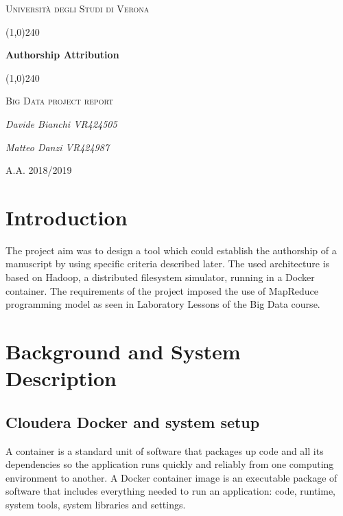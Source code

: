 \documentclass[a4paper,11pt, twoside]{article}
\begin{document}
	\clearpage
	\begin{titlepage}
		\centering
		\vspace*{\fill}
		{\scshape\LARGE Università degli Studi di Verona \par}
		\vspace{1.5cm}
		\line(1,0){240} \\
		{\huge\bfseries Authorship Attribution\par}
		\line(1,0){240} \\
		\vspace{0.5cm}
		{\scshape\Large Big Data project report\par}
		\vspace{2cm}
		{\Large\itshape Davide Bianchi VR424505\par
		\Large\itshape Matteo Danzi VR424987\par}
		\vspace{1cm}
		\vspace{5cm}
		\vspace*{\fill}
		{\large A.A. 2018/2019\par}
	\end{titlepage}
	\thispagestyle{empty}
	\newpage
	\tableofcontents
	\newpage
	
	\section{Introduction}
	The project aim was to design a tool which could establish the authorship of a manuscript by using specific criteria described later. 
	The used architecture is based on Hadoop, a distributed filesystem simulator, running in a Docker container. The requirements of the project imposed the use of MapReduce programming model as seen in Laboratory Lessons of the Big Data course.

	\section{Background and System Description}
    \subsection{Cloudera Docker and system setup}
		A container is a standard unit of software that packages up code and all its dependencies so the application runs quickly and reliably from one computing environment to another. A Docker container image is an executable package of software that includes everything needed to run an application: code, runtime, system tools, system libraries and settings.
\end{document}
